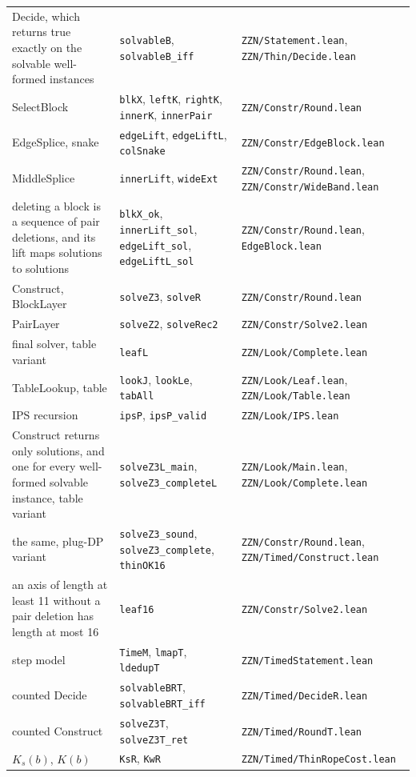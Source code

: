 \documentclass[11pt]{article}
\newcommand{\lean}[1]{\texttt{#1}}
\newcommand{\lf}[1]{\nolinkurl{#1}}
\begin{document}
{\begin{longtable}{@{}>{\raggedright\arraybackslash}p{}>{\raggedright\arraybackslash}p{}>{\raggedright\arraybackslash}p{}@{}}
Decide, which returns true exactly on the solvable well-formed instances & \lean{solvableB}, \lean{solvableB\_iff} & \lf{ZZN/Statement.lean}, \lf{ZZN/Thin/Decide.lean} \\
SelectBlock & \lean{blkX}, \lean{leftK}, \lean{rightK}, \lean{innerK}, \lean{innerPair} & \lf{ZZN/Constr/Round.lean} \\
EdgeSplice, snake & \lean{edgeLift}, \lean{edgeLiftL}, \lean{colSnake} & \lf{ZZN/Constr/EdgeBlock.lean} \\
MiddleSplice & \lean{innerLift}, \lean{wideExt} & \lf{ZZN/Constr/Round.lean}, \lf{ZZN/Constr/WideBand.lean} \\
deleting a block is a sequence of pair deletions, and its lift maps solutions to solutions & \lean{blkX\_ok}, \lean{innerLift\_sol}, \lean{edgeLift\_sol}, \lean{edgeLiftL\_sol} & \lf{ZZN/Constr/Round.lean}, \lf{EdgeBlock.lean} \\
Construct, BlockLayer & \lean{solveZ3}, \lean{solveR} & \lf{ZZN/Constr/Round.lean} \\
PairLayer & \lean{solveZ2}, \lean{solveRec2} & \lf{ZZN/Constr/Solve2.lean} \\
final solver, table variant & \lean{leafL} & \lf{ZZN/Look/Complete.lean} \\
TableLookup, table & \lean{lookJ}, \lean{lookLe}, \lean{tabAll} & \lf{ZZN/Look/Leaf.lean}, \lf{ZZN/Look/Table.lean} \\
IPS recursion & \lean{ipsP}, \lean{ipsP\_valid} & \lf{ZZN/Look/IPS.lean} \\
Construct returns only solutions, and one for every well-formed solvable instance, table variant & \lean{solveZ3L\_main}, \lean{solveZ3\_completeL} & \lf{ZZN/Look/Main.lean}, \lf{ZZN/Look/Complete.lean} \\
the same, plug-DP variant & \lean{solveZ3\_sound}, \lean{solveZ3\_complete}, \lean{thinOK16} & \lf{ZZN/Constr/Round.lean}, \lf{ZZN/Timed/Construct.lean} \\
an axis of length at least 11 without a pair deletion has length at most 16 & \lean{leaf16} & \lf{ZZN/Constr/Solve2.lean} \\
step model & \lean{TimeM}, \lean{lmapT}, \lean{ldedupT} & \lf{ZZN/TimedStatement.lean} \\
counted Decide & \lean{solvableBRT}, \lean{solvableBRT\_iff} & \lf{ZZN/Timed/DecideR.lean} \\
counted Construct & \lean{solveZ3T}, \lean{solveZ3T\_ret} & \lf{ZZN/Timed/RoundT.lean} \\
$K_s(b)$, $K(b)$ & \lean{KsR}, \lean{KwR} & \lf{ZZN/Timed/ThinRopeCost.lean} \\

\end{longtable}}
\end{document}
